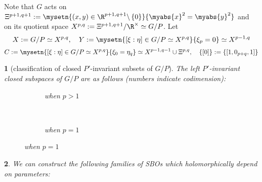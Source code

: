 \documentclass[8pt,notes,notheorems]{beamer}
\renewcommand{\setminus}{\backslash}
\newtheorem{theorem}{\translate{Theorem}}[section]
\newtheorem{theorem}{\translate{Theorem}}
\theoremstyle{definition}
\theoremstyle{example}
\theoremstyle{plain}
\theoremstyle{mystyle}
\begin{document}
\begin{frame}
Note that $G$ acts on $\Xi^{p+1,q+1}:=\mysetn{(x,y)\in\R^{p+1,q+1}\setminus\left\{ 0 \right\}}{\myabs{x}^2=\myabs{y}^2}$ and on its quotient space
$X^{p,q}:=\Xi^{p+1,q+1}/\R^{\times}\simeq G/P$. Let
\[
	X:=G/P\simeq X^{p,q},\quad Y:=\mysetn{[\xi:\eta]\in G/P\simeq X^{p,q}}{\xi_{p}=0}\simeq X^{p-1,q}\]
	\[C:=\mysetn{[\xi:\eta]\in G/P\simeq X^{p,q}}{\xi_{0}=\eta_q}\simeq X^{p-1,q-1}\cup\Xi^{p,q},\quad\left\{ [0] \right\}:=\left\{ [1,0_{p+q},1] \right\}\]
\begin{theorem}[classification of closed $P'$-invariant subsets of $G/P$]
	The left $P'$-invariant closed subspaces of $G/P$ are as follows (numbers indicate codimension):\\
  \begin{figure}[H]
    \centering
    \begin{subfigure}[t]{0.3\textwidth}
	    \xymatrixrowsep{0.5pc}
	\caption{when $p>1$}
    \end{subfigure}
    ~ %
    \begin{subfigure}[t]{0.3\textwidth}
	    \xymatrixrowsep{0.5pc}
	    {}
	\caption{when $p=1$}
    \end{subfigure}
\end{figure}
\end{theorem}
\end{frame}
\begin{frame}
	\begin{theorem}
		We can construct the following families of SBOs which holomorphically depend on parameters:
		
	\end{theorem}
\end{frame}
\end{document}
